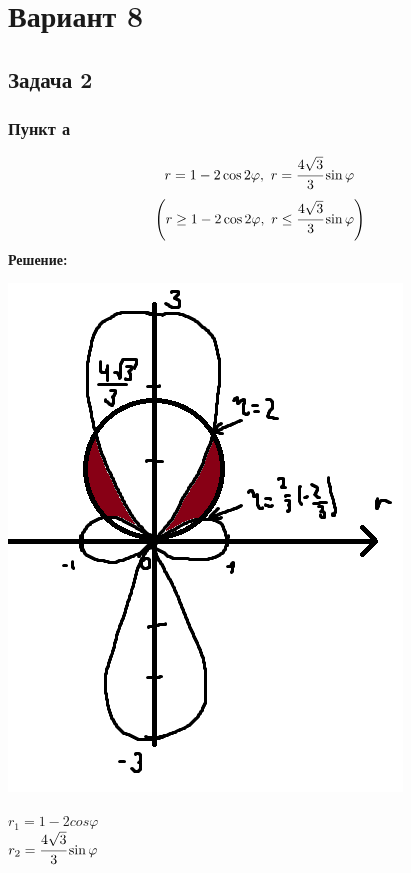 \section*{Вариант 8}
\subsection*{Задача 2}
\subsubsection*{Пункт а}
$$r = 1 - 2 \cos 2 \varphi, ~ r = \cfrac{4 \sqrt{3}}{3} \sin \varphi$$
$$\left(r \geq 1 - 2 \cos 2 \varphi, ~ r \leq \cfrac{4 \sqrt{3}}{3} \sin \varphi \right)$$
\textbf{Решение:}


\begin{minipage}{0.3\textwidth}
\includegraphics[width=\linewidth]{pics/pic1.png}
\end{minipage}
\hfill
\begin{minipage}{0.6\textwidth}\raggedleft
$r_1 = 1-2cos\varphi$ \\
$r_2 = \cfrac{4 \sqrt{3}}{3} \sin \varphi$
\end{minipage}

